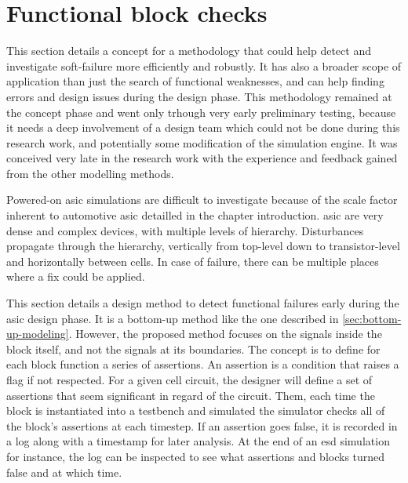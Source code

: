 \section{Functional block checks}

This section details a concept for a methodology that could help detect and investigate soft-failure more efficiently and robustly.
It has also a broader scope of application than just the search of functional weaknesses, and can help finding errors and design issues during the design phase.
This methodology remained at the concept phase and went only trhough very early preliminary testing, because it needs a deep involvement of a design team which could not be done during this research work, and potentially some modification of the simulation engine.
It was conceived very late in the research work with the experience and feedback gained from the other modelling methods.


Powered-on \gls{asic} simulations are difficult to investigate because of the scale factor inherent to automotive \gls{asic} detailled in the chapter introduction.
\gls{asic} are very dense and complex devices, with multiple levels of hierarchy.
Disturbances propagate through the hierarchy, vertically from top-level down to transistor-level and horizontally between cells.
In case of failure, there can be multiple places where a fix could be applied.

This section details a design method to detect functional failures early during the \gls{asic} design phase.
It is a bottom-up method like the one described in \ref{sec:bottom-up-modeling}.
However, the proposed method focuses on the signals inside the block itself, and not the signals at its boundaries.
The concept is to define for each block function a series of assertions.
An assertion is a condition that raises a flag if not respected.
For a given cell circuit, the designer will define a set of assertions that seem significant in regard of the circuit.
Them, each time the block is instantiated into a testbench and simulated the simulator checks all of the block's assertions at each timestep.
If an assertion goes false, it is recorded in a log along with a timestamp for later analysis.
At the end of an \gls{esd} simulation for instance, the log can be inspected to see what assertions and blocks turned false and at which time.

